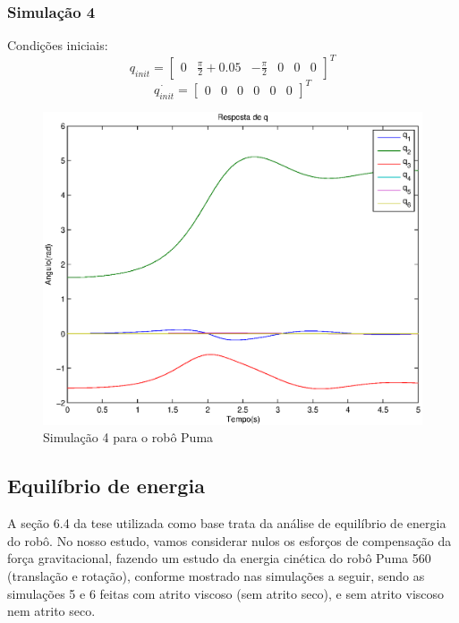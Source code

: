 \documentclass{article}
\begin{document}
\subsubsection{Simulação 4}
Condições iniciais:
\begin{equation}
\label{eq:sim4q}
q_{init}=\begin{bmatrix}
0 & \frac{\pi}{2}+0.05 & -\frac{\pi}{2} & 0 & 0 & 0
\end{bmatrix}^T
\end{equation}
\begin{equation}
\label{eq:sim4qd}
\dot{q_{init}}=\begin{bmatrix}
0 & 0 & 0 & 0 & 0 & 0
\end{bmatrix}^T
\end{equation}

\begin{figure}[H]
	\centering
	\includegraphics[width=0.8\linewidth]{../sim4ode}
	\caption{Simulação 4 para o robô Puma}
	\label{fig:pumasim4}
\end{figure}


\subsection{Equilíbrio de energia}
A seção 6.4 da tese\cite{bb:tese} utilizada como base trata da análise de equilíbrio de energia do robô. No nosso estudo, vamos considerar nulos os esforços de compensação da força gravitacional, fazendo um estudo da energia cinética do robô Puma 560 (translação e rotação), conforme mostrado nas simulações a seguir, sendo as simulações 5 e 6 feitas com atrito viscoso (sem atrito seco), e sem atrito viscoso nem atrito seco.
\end{document}
